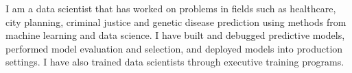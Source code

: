

\begin{cvparagraph}
I am a data scientist that has worked on problems in fields such as healthcare, city planning, criminal justice
and genetic disease prediction using methods from machine learning and data science. I have built and debugged predictive
models, performed model evaluation and selection, and deployed models into production settings. I have also trained
data scientists through executive training programs.
\end{cvparagraph}
